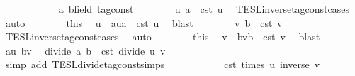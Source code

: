 \begin{isabellebody}
\ \ \isamarkupfalse%
\ {\isacharminus}\isanewline
\ \ \ \ \isacommand{{\isacharbraceleft}}\isamarkupfalse%
\ \isamarkupfalse%
\ a\ b{\isacharcolon}{\isacharcolon}{\isacartoucheopen}{\isacharparenleft}{\isacharprime}{\isasymtau}{\isacharcolon}{\isacharcolon}field\ tag{\isacharunderscore}const{\isacharparenright}{\isacartoucheclose}\isanewline
\ \ \ \ \ \ \isamarkupfalse%
\ {\isacartoucheopen}{\isasymexists}u{\isachardot}\ a\ {\isacharequal}\ {\isasymtau}\isactrlsub c\isactrlsub s\isactrlsub t\ u{\isacartoucheclose}\ \isamarkupfalse%
\ TESL{\isachardot}inverse{\isacharunderscore}tag{\isacharunderscore}const{\isachardot}cases\ \isamarkupfalse%
\ auto\isanewline
\ \ \ \ \ \ \isamarkupfalse%
\ this\ \isamarkupfalse%
\ u\ \ au{\isacharcolon}{\isacartoucheopen}a\ {\isacharequal}\ {\isasymtau}\isactrlsub c\isactrlsub s\isactrlsub t\ u{\isacartoucheclose}\ \isamarkupfalse%
\ blast\isanewline
\ \ \ \ \ \ \isamarkupfalse%
\ {\isacartoucheopen}{\isasymexists}v{\isachardot}\ b\ {\isacharequal}\ {\isasymtau}\isactrlsub c\isactrlsub s\isactrlsub t\ v{\isacartoucheclose}\ \isamarkupfalse%
\ TESL{\isachardot}inverse{\isacharunderscore}tag{\isacharunderscore}const{\isachardot}cases\ \isamarkupfalse%
\ auto\isanewline
\ \ \ \ \ \ \isamarkupfalse%
\ this\ \isamarkupfalse%
\ v\ \ bv{\isacharcolon}{\isacartoucheopen}b\ {\isacharequal}\ {\isasymtau}\isactrlsub c\isactrlsub s\isactrlsub t\ v{\isacartoucheclose}\ \isamarkupfalse%
\ blast\isanewline
\ \ \ \ \ \ \isamarkupfalse%
\ au\ bv\ \isamarkupfalse%
\ {\isacartoucheopen}divide\ a\ b\ {\isacharequal}\ {\isasymtau}\isactrlsub c\isactrlsub s\isactrlsub t\ {\isacharparenleft}divide\ u\ v{\isacharparenright}{\isacartoucheclose}\isanewline
\ \ \ \ \ \ \ \ \isamarkupfalse%
\ {\isacharparenleft}simp\ add{\isacharcolon}\ TESL{\isachardot}divide{\isacharunderscore}tag{\isacharunderscore}const{\isachardot}simps{\isacharparenright}\isanewline
\ \ \ \ \ \ \isamarkupfalse%
\ \isamarkupfalse%
\ {\isacartoucheopen}{\isachardot}{\isachardot}{\isachardot}\ {\isacharequal}\ {\isasymtau}\isactrlsub c\isactrlsub s\isactrlsub t\ {\isacharparenleft}times\ u\ {\isacharparenleft}inverse\ v{\isacharparenright}{\isacharparenright}{\isacartoucheclose}\isanewline
\ \ \ \ \ \ \ \ \isamarkupfalse%

\end{isabellebody}

